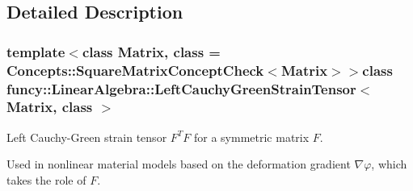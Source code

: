 \subsection{Detailed Description}
\subsubsection*{template$<$class Matrix, class = Concepts\-::\-Square\-Matrix\-Concept\-Check$<$\-Matrix$>$$>$class funcy\-::\-Linear\-Algebra\-::\-Left\-Cauchy\-Green\-Strain\-Tensor$<$ Matrix, class $>$}

Left Cauchy-\/\-Green strain tensor $ F^T F $ for a symmetric matrix $ F $. 

Used in nonlinear material models based on the deformation gradient $\nabla\varphi$, which takes the role of $F$. 

